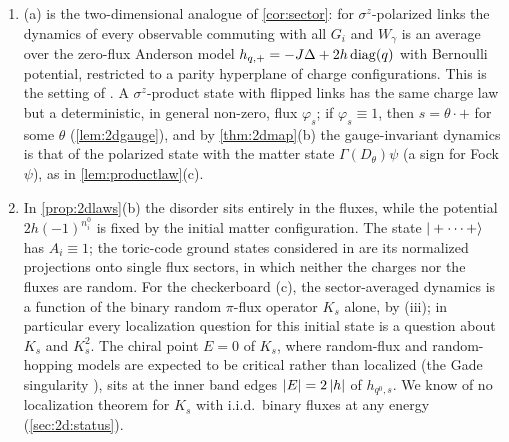 \begin{remark}[Interpretation]\label{rem:2dlaws}
\leavevmode
\begin{enumerate}[label=(\alph*)]
\item {}(a) is the two-dimensional analogue of \cref{cor:sector}: for $\sigma^z$-polarized
links the dynamics of every observable commuting with all $G_i$ and $W_\gamma$ is an average over the zero-flux
Anderson model $h_{q,+}=-J\Delta+2h\operatorname{diag}(q)$
with Bernoulli potential, restricted to a parity hyperplane of charge configurations.  This is the setting of
\cite{SKKM2018}.  A $\sigma^z$-product state with flipped links has the same charge law but a deterministic,
in general non-zero, flux $\varphi_s$; if $\varphi_s\equiv1$, then $s=\theta\cdot+$ for some $\theta$
(\cref{lem:2dgauge}), and by \cref{thm:2dmap}(b) the gauge-invariant dynamics is that of the polarized state with
the matter state $\Gamma(D_\theta)\psi$ (a sign for Fock $\psi$), as in \cref{lem:productlaw}(c).
\item In \cref{prop:2dlaws}(b) the disorder sits entirely in the fluxes, while the potential
$2h(-1)^{n^0_i}$ is fixed by the initial matter configuration.  The state $|+\cdots+\rangle$ has $A_i\equiv1$; the
toric-code ground states considered in \cite[Sect.~I.C]{SKKM2018} are its normalized projections onto single flux
sectors, in which neither the charges nor the fluxes are random.  For the checkerboard (c), the
sector-averaged dynamics is a function of the binary random $\pi$-flux operator $K_s$ alone, by (iii); in
particular every localization question for this initial state is a question about $K_s$ and $K_s^2$.  The
chiral point $E=0$ of $K_s$, where random-flux and random-hopping models are expected to be critical rather than
localized (the Gade singularity \cite{Gade1993}), sits at the inner band edges $\left|E\right|=2\left|h\right|$ of
$h_{q^0,s}$.  We know of no localization theorem for $K_s$ with i.i.d.\ binary fluxes at any energy
(\cref{sec:2d:status}).
\end{enumerate}
\end{remark}

